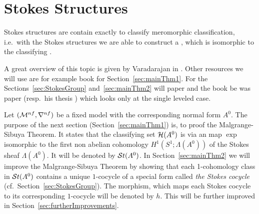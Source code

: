 \chapter{Stokes Structures}\label{chap:stokes}
Stokes structures are contain exactly  to
classify meromorphic classification, i.e.\ with the Stokes structures we are
able to construct a , which is isomorphic to the classifying
.

A great overview of this topic is given by Varadarajan in
\cite{Varadarajan96linearmeromorphic}. Other resources we will use are for
example  book \cite[section II]{sabbah2007isomonodromic} for
Section~\ref{sec:mainThm1}.
For the Sections~\ref{sec:StokesGroup} and~\ref{sec:mainThm2} will
 paper \cite{Loday1994} and the book
\cite[Sec.4]{Loday2014} be  was 
paper \cite{boalch} (resp.\ his thesis \cite{thboalch}) which looks only at the
single leveled case.

Let $(\mathcal{M}^{nf},\nabla^{nf})$ be a fixed model with the corresponding normal
form $A^0$.
The purpose of the next section (Section~\ref{sec:mainThm1}) is, to proof the
Malgrange-Sibuya Theorem.
It states that the classifying set $\mathcal{H}(A^0)$ is via an map $\exp$ isomorphic
to the first non abelian cohomology $H^1(S^1;\Lambda(A^0))$ of the Stokes sheaf
$\Lambda(A^0)$. It will be denoted by $\mathcal{S}{}t(A^0)$.
In Section~\ref{sec:mainThm2} we will improve the Malgrange-Sibuya Theorem by
showing that each 1-cohomology class in $\mathcal{S}{}t(A^0)$ contains a unique
$1$-cocycle of a special form called \emph{the Stokes cocycle}
(cf.\ Section~\ref{sec:StokesGroup}).
The morphism, which maps each Stokes cocycle to its corresponding $1$-cocycle
will be denoted by $h$.
This will be further improved in Section~\ref{sec:furtherImprovements}.

